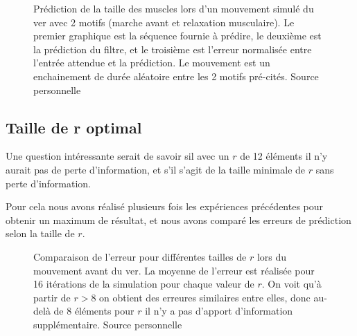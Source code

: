 \begin{figure}[ht]
   \begin{center}
   \end{center}
   \caption[Prédiction de la taille des muscles lors d'un mouvement avec 2
   motifs]{Prédiction de la taille des muscles lors d'un mouvement simulé du ver
   avec 2 motifs (marche avant et relaxation musculaire). Le premier graphique est
   la séquence fournie à prédire, le deuxième est la prédiction du filtre, et le
   troisième est l'erreur normalisée entre l'entrée attendue et la prédiction.
   Le mouvement est un enchainement de durée aléatoire entre les 2 motifs
   pré-cités. Source personnelle}
   \label{fig:sequence_mouvement_complexe_2pattern}
\end{figure}


\subsection{Taille de r optimal} %
\label{sub:Taille de r optimal}

Une question intéressante serait de savoir sil avec un $r$ de 12 éléments il n'y aurait
pas de perte d'information, et s'il s'agit de la taille minimale de $r$ sans perte
d'information.

Pour cela nous avons réalisé plusieurs fois les expériences précédentes pour obtenir
un maximum de résultat, et nous avons comparé les erreurs de prédiction selon la
taille de $r$.


\begin{figure}[ht]
   \begin{center}
   \end{center}
   \caption[Comparaison de l'erreur pour différents $r$ lors du mouvement avant]{
   Comparaison de l'erreur pour différentes tailles de $r$ lors du mouvement avant
   du ver. La moyenne de l'erreur est réalisée pour 16 itérations de la simulation
   pour chaque valeur de $r$. On voit qu'à partir de $r > 8$ on obtient des erreures similaires entre elles, 
donc au-delà de 8 éléments pour $r$ il n'y a pas
   d'apport d'information supplémentaire. Source personnelle}
   \label{fig:comparaison_r_mouvement_simple}
\end{figure}

